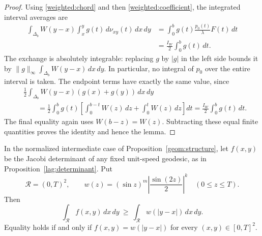 \begin{proof}
Using \eqref{weighted:chord} and then
\eqref{weighted:coefficient}, the integrated interval averages are
\begin{align*}
 \int_{\Delta_b}W(y-x)\int_x^y g(t)\,d\nu_{xy}(t)\,dx\,dy
 &=\int_0^b g(t)\frac{p_0(t)}{\lambda}F(t)\,dt\\
 &=\frac{I_W}{2}\int_0^b g(t)\,dt.
\end{align*}
The exchange is absolutely integrable: replacing $g$ by $|g|$ in the
left side bounds it by
$\|g\|_\infty\int_{\Delta_b}W(y-x)\,dx\,dy$.
In particular, no integral of $p_0$ over the entire interval is taken.
The endpoint terms have exactly the same value, since
\begin{align*}
 &\frac12\int_{\Delta_b}W(y-x)(g(x)+g(y))\,dx\,dy\\
 &\qquad=\frac12\int_0^b g(t)
 \left[\int_0^{b-t}W(z)\,dz+\int_0^t W(z)\,dz\right]dt
 =\frac{I_W}{2}\int_0^b g(t)\,dt.
\end{align*}
The final equality again uses $W(b-z)=W(z)$.  Subtracting these equal
finite quantities proves the identity and hence the lemma.
\end{proof}

\begin{theorem}\label{weighted:geodesic}
In the normalized intermediate case of Proposition~\ref{geom:structure},
let $f(x,y)$ be the Jacobi determinant of any fixed unit-speed geodesic,
as in Proposition~\ref{lag:determinant}.  Put
\[
 \mathcal R=(0,T)^2,\qquad
 w(z)=(\sin z)^m\left|\frac{\sin(2z)}2\right|^k
 \quad(0\leq z\leq T).
\]
Then
\begin{equation}
 \int_{\mathcal R}f(x,y)\,dx\,dy
 \ \geq\ \int_{\mathcal R}w(|y-x|)\,dx\,dy.
 \label{weighted:comparison}
\end{equation}
Equality holds if and only if
$f(x,y)=w(|y-x|)$ for every $(x,y)\in[0,T]^2$.
\end{theorem}

